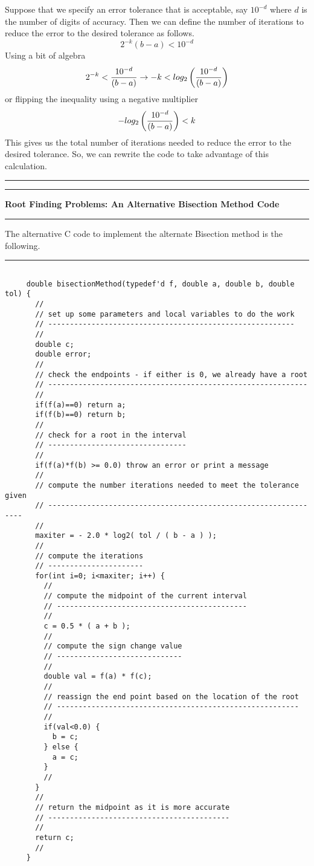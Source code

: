 \documentclass[10pt,fleqn]{article}
\begin{document}
Suppose that we specify an error tolerance that is acceptable, say $10^{-d}$
where $d$ is the number of digits of accuracy. Then we can define the number of
iterations to reduce the error to the desired tolerance as follows.
$$
  2^{-k} ( b - a ) < 10^{-d}
$$
Using a bit of algebra
$$
  2^{-k} < {{10^{-d}}\over{(b-a)}}
   \rightarrow -k < log_2\left( {{10^{-d}}\over{(b-a)}}\right)
$$
or flipping the inequality using a negative multiplier
$$
  - log_2\left( {{10^{-d}}\over{(b-a)}}\right) < k 
$$
This gives us the total number of iterations needed to reduce the error to the
desired tolerance. So, we can rewrite the code to take advantage of this
calculation.
\vskip0.1in\hrule\vskip0.1in
\newpage
\vskip0.1in\hrule\vskip0.1in
\noindent
{\bf Root Finding Problems: An Alternative Bisection Method Code}
\vskip0.1in\hrule\vskip0.1in
\noindent
The alternative C code to implement the alternate Bisection method is the
following.
\vskip0.1in\hrule\vskip0.1in
\begin{verbatim}

     double bisectionMethod(typedef'd f, double a, double b, double tol) {
       //
       // set up some parameters and local variables to do the work
       // ---------------------------------------------------------
       //
       double c;
       double error;
       //
       // check the endpoints - if either is 0, we already have a root
       // ------------------------------------------------------------
       //
       if(f(a)==0) return a;
       if(f(b)==0) return b;
       //
       // check for a root in the interval
       // --------------------------------
       //
       if(f(a)*f(b) >= 0.0) throw an error or print a message
       //
       // compute the number iterations needed to meet the tolerance given
       // ----------------------------------------------------------------
       //
       maxiter = - 2.0 * log2( tol / ( b - a ) );
       //
       // compute the iterations
       // ----------------------
       for(int i=0; i<maxiter; i++) {
         //
         // compute the midpoint of the current interval
         // --------------------------------------------
         //
         c = 0.5 * ( a + b );
         //
         // compute the sign change value
         // -----------------------------
         //
         double val = f(a) * f(c);
         //
         // reassign the end point based on the location of the root
         // --------------------------------------------------------
         //
         if(val<0.0) {
           b = c;
         } else {
           a = c;
         }
         //
       }
       //
       // return the midpoint as it is more accurate
       // ------------------------------------------
       //
       return c;
       //
     }

\end{verbatim}
\end{document}

